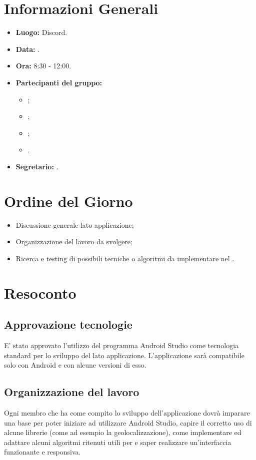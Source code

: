 \section{Informazioni Generali}
\begin{itemize}
\item \textbf{Luogo:} Discord.
\item \textbf{Data:} \Data.
\item \textbf{Ora:} 8:30 - 12:00.
\item \textbf{Partecipanti del gruppo:}
	\begin{itemize}
		\item \DF{};
		\item \MC{};
		\item \SE{};
		\item \BR{}.
	\end{itemize} 
\item \textbf{Segretario:} \MC{}.
\end{itemize}

\section{Ordine del Giorno}
\begin{itemize}
	\item Discussione generale lato applicazione;
	\item Organizzazione del lavoro da svolgere;
	\item Ricerca e testing di possibili tecniche o algoritmi da implementare nel .
\end{itemize}


\section{Resoconto}
\subsection{Approvazione tecnologie}
E' stato approvato l'utilizzo del programma Android Studio come tecnologia standard per lo sviluppo del  lato applicazione. L'applicazione sarà compatibile solo
con Android e con alcune versioni di esso.

\subsection{Organizzazione del lavoro}
Ogni membro che ha come compito lo sviluppo dell'applicazione dovrà imparare una base per poter iniziare ad utilizzare Android Studio, capire il corretto uso di alcune
librerie (come ad esempio la geolocalizzazione), come implementare ed adattare alcuni algoritmi ritenuti utili per  e saper realizzare un'interfaccia
 funzionante e responsiva.

